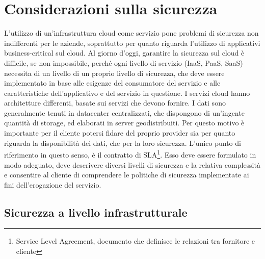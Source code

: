 \section{Considerazioni sulla sicurezza}
L'utilizzo di un'infrastruttura cloud come servizio pone problemi di sicurezza non indifferenti per le aziende, soprattutto per quanto riguarda l'utilizzo di applicativi business-critical sul cloud.
Al giorno d'oggi, garantire la sicurezza sul cloud è difficile, se non impossibile, perché ogni livello di servizio (IaaS, PaaS, SaaS) necessita di un livello di un proprio livello di sicurezza, che deve essere implementato in base alle esigenze del consumatore del servizio e alle caratteristiche dell'applicativo e del servizio in questione.
I servizi cloud hanno architetture differenti, basate sui servizi che devono fornire. I dati sono generalmente tenuti in datacenter centralizzati, che dispongono di un'ingente quantità di storage, ed elaborati in server geodistribuiti. Per questo motivo è importante per il cliente potersi fidare del proprio provider sia per quanto riguarda la disponibilità dei dati, che per la loro sicurezza.
L'unico punto di riferimento in questo senso, è il contratto di SLA\footnote{Service Level Agreement, documento che definisce le relazioni tra fornitore e cliente}.
Esso deve essere formulato in modo adeguato, deve descrivere diversi livelli di sicurezza e la relativa complessità e consentire al cliente di comprendere le politiche di sicurezza implementate ai fini dell'erogazione del servizio.\cite{CloudSecurityIssues}


\subsection{Sicurezza a livello infrastrutturale}
